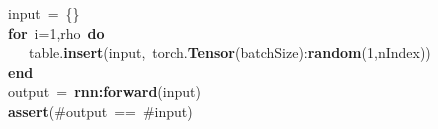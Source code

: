 \noindent
\mbox{}input\ =\ \{\} \\
\mbox{}\textbf{for}\ i=1,rho\ \textbf{do} \\
\mbox{}\ \ \ table.\textbf{insert}(input,\ torch.\textbf{Tensor}(batchSize):\textbf{random}(1,nIndex)) \\
\mbox{}\textbf{end} \\
\mbox{}output\ =\ \textbf{rnn:forward}(input) \\
\mbox{}\textbf{assert}(\#output\ ==\ \#input)
